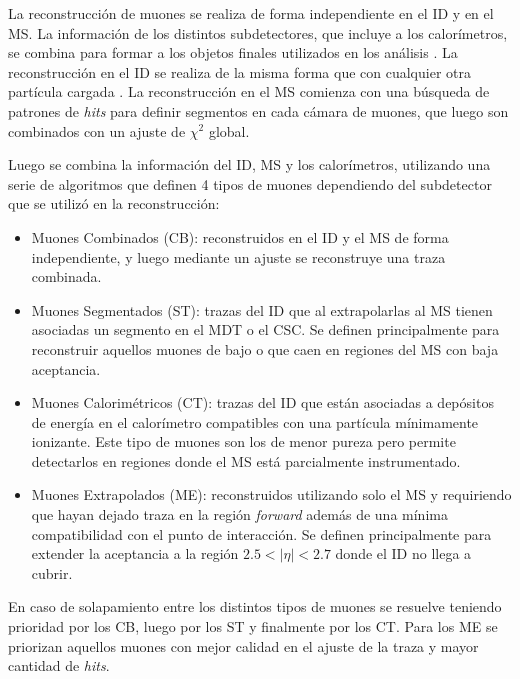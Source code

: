 La reconstrucción de muones se realiza de forma independiente en el ID y en el MS. La información de los distintos subdetectores, que incluye a los calorímetros, se combina para formar a los objetos finales utilizados en los análisis \cite{PERF-2015-10}. La reconstrucción en el ID se realiza de la misma forma que con cualquier otra partícula cargada \cite{newt, silicon}. La reconstrucción en el MS comienza con una búsqueda de patrones de \textit{hits} para definir segmentos en cada cámara de muones, que luego son combinados con un ajuste de $\chi^2$ global.

Luego se combina la información del ID, MS y los calorímetros, utilizando una serie de algoritmos que definen 4 tipos de muones dependiendo del subdetector que se utilizó en la reconstrucción:

\begin{itemize}

	\item Muones Combinados (CB): reconstruidos en el ID y el MS de forma independiente, y luego mediante un ajuste se reconstruye una traza combinada.

	\item Muones Segmentados (ST): trazas del ID que al extrapolarlas al MS tienen asociadas un segmento en el MDT o el CSC. Se definen principalmente para reconstruir aquellos muones de bajo \pt o que caen en regiones del MS con baja aceptancia.

	\item Muones Calorimétricos (CT): trazas del ID que están asociadas a depósitos de energía en el calorímetro compatibles con una partícula mínimamente ionizante. Este tipo de muones son los de menor pureza pero permite detectarlos en regiones donde el MS está parcialmente instrumentado.

	\item Muones Extrapolados (ME): reconstruidos utilizando solo el MS y requiriendo que hayan dejado traza en la región \textit{forward} además de una mínima compatibilidad con el punto de interacción. Se definen principalmente para extender la aceptancia a la región $2.5<|\eta|<2.7$ donde el ID no llega a cubrir.

\end{itemize}

En caso de solapamiento entre los distintos tipos de muones se resuelve teniendo prioridad por los CB, luego por los ST y finalmente por los CT. Para los ME se priorizan aquellos muones con mejor calidad en el ajuste de la traza y mayor cantidad de \textit{hits}.

